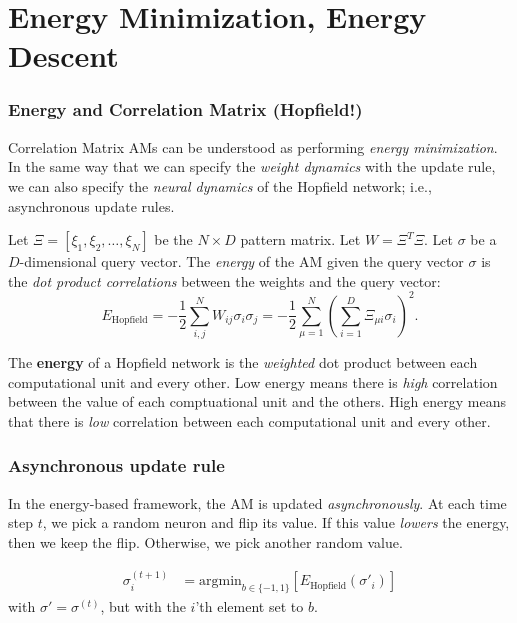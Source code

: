 \documentclass{beamer}
\begin{document}
\section{Energy Minimization, Energy Descent}
\begin{frame}
\frametitle{Energy and Correlation Matrix (Hopfield!)}
Correlation Matrix AMs can be understood as performing \textit{energy minimization}.
In the same way that we can specify the \textit{weight dynamics} with the update 
rule, we can also specify the \textit{neural dynamics} of the Hopfield network;
i.e., asynchronous update rules.
\begin{definition}
    Let $\Xi = [\xi_1, \xi_2, \dots, \xi_N]$ be the $N \times D$ pattern matrix.
    Let $W = \Xi^T \Xi$. Let $\sigma$ be a $D$-dimensional query vector. The
    \textit{energy} \parencites{krotov_dense_2016,hopfield_neurons_1984} of the 
    AM given the query vector $\sigma$ is the 
    \textit{dot product correlations} between the weights and the query vector:
    $$
    E_\text{Hopfield} = - \frac{1}{2} \sum^N_{i,j} W_{ij} \sigma_i \sigma_j = 
    - \frac{1}{2} \sum^N_{\mu=1} \left( \sum^D_{i=1} \Xi_{\mu i} \sigma_i \right)^2.
    $$
\end{definition}
\end{frame}

\begin{frame}
    \begin{tcolorbox}[colback=blue!5, colframe=blue!40, title=Energy intuition]
        The \textbf{energy} of a Hopfield network is the \textit{weighted} dot 
        product between each computational unit and every other. Low energy
        means there is \textit{high} correlation between the value of each 
        comptuational unit and the others. High energy means that there is 
        \textit{low} correlation between each computational unit and every other.
    \end{tcolorbox}
\end{frame}

\begin{frame}
\frametitle{Asynchronous update rule}
    In the energy-based framework, the AM is updated \textit{asynchronously}.
    At each time step $t$, we pick a random neuron and flip its value. If this
    value \textit{lowers} the energy, then we keep the flip. Otherwise, we 
    pick another random value.

    \begin{definition}
        \begin{align*}
        \sigma^{(t+1)}_i &= \text{argmin}_{b \in \{-1, 1\}}[E_\text{Hopfield}(\sigma'_i)]
        \end{align*}
        with $\sigma' = \sigma^{(t)}$, but with the $i$'th element set to $b$.
    \end{definition}
\end{frame}
\end{document}
